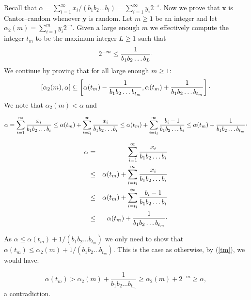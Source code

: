 \documentclass{elsart}
\begin{document}
Recall that $\alpha = \sum_{i=1}^{\infty} x_{i}/(b_{1} b_{2}\ldots b_{i}) =
\sum_{i=1}^{\infty} y_{i}2^{-i}$. Now we prove that ${\mathbf x}$ is Cantor--random
whenever ${\mathbf y}$ is random. Let $m\ge 1$ be an integer and let $\alpha_{2}(m)
= \sum_{i=1}^{m} y_{i}2^{-i}$. Given  a large enough $m$ we effectively
compute the integer $t_{m}$ to be the maximum integer $L\ge 1$ such that
\begin{equation}
\label{tm}
2^{-m} \le \frac{1}{b_{1}b_{2}\ldots b_{L}}{\raisebox{.5ex}{.}}
\end{equation}
We continue by proving that for all large enough  $m\ge 1$:
\begin{equation}
\label{cantorineq}
[\alpha_{2}(m), \alpha] \subseteq \left[\alpha (t_{m})
-
\frac{1}{b_{1}b_{2}\ldots b_{t_{m}}}, \alpha (t_{m}) +
\frac{1}{b_{1}b_{2}\ldots b_{t_{m}}}\right]{\raisebox{.5ex}{.}}
\end{equation}
We note that $\alpha_{2}(m) < \alpha$ and



\[\alpha  =   \sum_{i=1}^{\infty} \frac{x_{i}}{b_{1}b_{2}\ldots b_{i}}
 \le   \alpha (t_{m}) + \sum_{i=t_{l}}^{\infty}
\frac{x_{i}}{b_{1}b_{2}\ldots b_{i}}
 \le  \alpha (t_{m}) + \sum_{i=t_{l}}^{\infty}
\frac{b_{i}-1}{b_{1}b_{2}\ldots b_{i}} \\
 \le  \alpha (t_{m}) + \frac{1}{b_{1}b_{2}\ldots b_{t_{m}}} {\raisebox{.5ex}{.}}
\]

\begin{eqnarray*}
\alpha & = &  \sum_{i=1}^{\infty} \frac{x_{i}}{b_{1}b_{2}\ldots b_{i}} \\
& \le &  \alpha (t_{m}) + \sum_{i=t_{l}}^{\infty}
\frac{x_{i}}{b_{1}b_{2}\ldots b_{i}} \\
& \le & \alpha (t_{m}) + \sum_{i=t_{l}}^{\infty}
\frac{b_{i}-1}{b_{1}b_{2}\ldots b_{i}} \\
& \le & \alpha (t_{m}) + \frac{1}{b_{1}b_{2}\ldots b_{t_{m}}} {\raisebox{.5ex}{.}}
\end{eqnarray*}

As $\alpha \le \alpha (t_{m}) + 1/(b_{1}b_{2}\ldots b_{t_{m}})$ we only need
to show that $\alpha (t_{m}) \le \alpha_{2} (m)+ 1/(b_{1}b_{2}\ldots
b_{t_{m}})$. This is the case as otherwise, by  (\ref{tm}), we would have:

\[\alpha (t_{m}) > \alpha_{2} (m) +
 \frac{1}{b_{1}b_{2}\ldots b_{t_{m}}} \ge \alpha_{2} (m) + 2^{-m}
 \ge \alpha,\]
 a contradiction.
\end{document}
